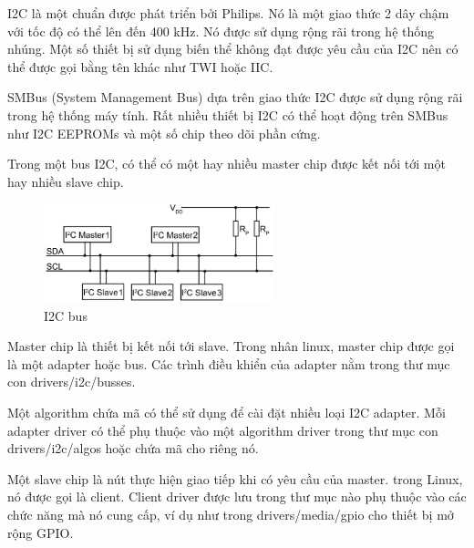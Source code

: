 
I2C là một chuẩn được phát triển bởi Philips. Nó là một giao thức 2 dây chậm với tốc độ có thể lên đến 400 kHz. Nó được sử dụng rộng rãi trong hệ thống nhúng. Một số thiết bị sử dụng biến thể không đạt được yêu cầu của I2C nên có thể được gọi bằng tên khác như TWI hoặc IIC.

SMBus (System Management Bus) dựa trên giao thức I2C được sử dụng rộng rãi trong hệ thống máy tính. Rất nhiều thiết bị I2C có thể hoạt động trên SMBus như I2C EEPROMs và một số chip theo dõi phần cứng.

Trong một bus I2C, có thể có một hay nhiều master chip được kết nối tới một hay nhiều slave chip.


\begin{figure}[H]
	\centering
	\includegraphics[width=0.6\textwidth]{images/I2C-Bus-Layout.jpg}
	\caption{I2C bus}
\end{figure}


Master chip là thiết bị kết nối tới slave. Trong nhân linux, master chip được gọi là một adapter hoặc bus. Các trình điều khiển của adapter nằm trong thư mục con drivers/i2c/busses.

Một algorithm chứa mã có thể sử dụng để cài đặt nhiều loại I2C adapter. Mỗi adapter driver có thể phụ thuộc vào một algorithm driver trong thư mục con drivers/i2c/algos hoặc chứa mã cho riêng nó.

Một slave chip là nút thực hiện giao tiếp khi có yêu cầu của master. trong Linux, nó được gọi là client. Client driver được lưu trong thư mục nào phụ thuộc vào các chức năng mà nó cung cấp, ví dụ như trong drivers/media/gpio cho thiết bị mở rộng GPIO.

